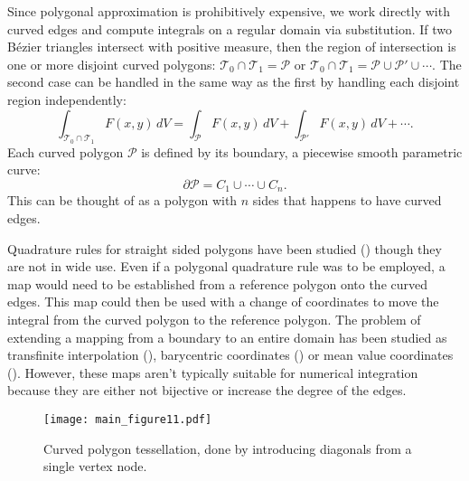 \documentclass[letterpaper,10pt]{article}
\theoremstyle{definition}
\begin{document}
Since polygonal approximation is prohibitively expensive,
we work directly with curved edges and compute integrals on a regular
domain via substitution.
If two B\'{e}zier triangles intersect with positive measure, then
the region of intersection is one or more disjoint curved polygons:
\(\mathcal{T}_0 \cap \mathcal{T}_1 = \mathcal{P}\) or
\(\mathcal{T}_0 \cap \mathcal{T}_1 = \mathcal{P} \cup
\mathcal{P}' \cup \cdots\).
The second case can be handled in the same way as the first by handling each
disjoint region independently:
\begin{equation}
\int_{\mathcal{T}_0 \cap \mathcal{T}_1} F(x, y) \, dV =
  \int_{\mathcal{P}} F(x, y) \, dV +
  \int_{\mathcal{P}'} F(x, y) \, dV + \cdots.
\end{equation}
Each curved polygon \(\mathcal{P}\) is defined by its boundary, a
piecewise smooth parametric curve:
\begin{equation}
\partial \mathcal{P} = C_1 \cup \cdots \cup C_n.
\end{equation}
This can be thought of as a polygon with \(n\) sides that happens to
have curved edges.

Quadrature rules for straight sided polygons have been
studied (\cite{Mousavi2009}) though they are not in wide use. Even
if a polygonal quadrature rule was to be employed, a map would need to be
established from a reference polygon onto the curved edges. This map
could then be used with a change of coordinates to move the integral
from the curved polygon to the reference polygon. The problem of extending
a mapping from a boundary to an entire domain has been studied as
transfinite interpolation
(\cite{chenin:tel-00284680, Gordon1982, Perronnet1998}),
barycentric coordinates (\cite{Wachspress1975}) or mean value coordinates
(\cite{Floater2003}). However, these maps aren't typically suitable for
numerical integration because they are either not bijective or increase the
degree of the edges.

\begin{figure}
  \texttt{[image: main\_figure11.pdf]}
  \centering
  \captionsetup{width=.75\linewidth}
  \caption{Curved polygon tessellation, done by introducing diagonals
    from a single vertex node.}
  \label{fig:tessellated-curved-polygon}
\end{figure}
\end{document}
